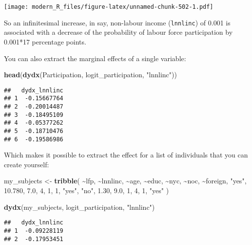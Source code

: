 \documentclass[
]{article}
\newenvironment{Shaded}{\begin{snugshade}}{\end{snugshade}}
\newcommand{\DecValTok}[1]{\textcolor[rgb]{0.00,0.00,0.81}{#1}}
\newcommand{\FloatTok}[1]{\textcolor[rgb]{0.00,0.00,0.81}{#1}}
\newcommand{\KeywordTok}[1]{\textcolor[rgb]{0.13,0.29,0.53}{\textbf{#1}}}
\newcommand{\NormalTok}[1]{#1}
\newcommand{\OperatorTok}[1]{\textcolor[rgb]{0.81,0.36,0.00}{\textbf{#1}}}
\newcommand{\StringTok}[1]{\textcolor[rgb]{0.31,0.60,0.02}{#1}}
\begin{document}
\texttt{[image: modern\_R\_files/figure-latex/unnamed-chunk-502-1.pdf]}

So an infinitesimal increase, in say, non-labour income (\texttt{lnnlinc}) of 0.001 is associated with a
decrease of the probability of labour force participation by 0.001*17 percentage points.

You can also extract the marginal effects of a single variable:

\begin{Shaded}
\begin{Highlighting}[]
\KeywordTok{head}\NormalTok{(}\KeywordTok{dydx}\NormalTok{(Participation, logit\_participation, }\StringTok{"lnnlinc"}\NormalTok{))}
\end{Highlighting}
\end{Shaded}

\begin{verbatim}
##   dydx_lnnlinc
## 1  -0.15667764
## 2  -0.20014487
## 3  -0.18495109
## 4  -0.05377262
## 5  -0.18710476
## 6  -0.19586986
\end{verbatim}

Which makes it possible to extract the effect for a list of individuals that you can create yourself:

\begin{Shaded}
\begin{Highlighting}[]
\NormalTok{my\_subjects \textless{}{-}}\StringTok{ }\KeywordTok{tribble}\NormalTok{(}
    \OperatorTok{\textasciitilde{}}\NormalTok{lfp,  }\OperatorTok{\textasciitilde{}}\NormalTok{lnnlinc, }\OperatorTok{\textasciitilde{}}\NormalTok{age, }\OperatorTok{\textasciitilde{}}\NormalTok{educ, }\OperatorTok{\textasciitilde{}}\NormalTok{nyc, }\OperatorTok{\textasciitilde{}}\NormalTok{noc, }\OperatorTok{\textasciitilde{}}\NormalTok{foreign,}
    \StringTok{"yes"}\NormalTok{,   }\FloatTok{10.780}\NormalTok{,  }\FloatTok{7.0}\NormalTok{,     }\DecValTok{4}\NormalTok{,    }\DecValTok{1}\NormalTok{,   }\DecValTok{1}\NormalTok{,     }\StringTok{"yes"}\NormalTok{,}
    \StringTok{"no"}\NormalTok{,      }\FloatTok{1.30}\NormalTok{,  }\FloatTok{9.0}\NormalTok{,     }\DecValTok{1}\NormalTok{,    }\DecValTok{4}\NormalTok{,   }\DecValTok{1}\NormalTok{,     }\StringTok{"yes"}
\NormalTok{)}

\KeywordTok{dydx}\NormalTok{(my\_subjects, logit\_participation, }\StringTok{"lnnlinc"}\NormalTok{)}
\end{Highlighting}
\end{Shaded}

\begin{verbatim}
##   dydx_lnnlinc
## 1  -0.09228119
## 2  -0.17953451
\end{verbatim}
\end{document}
